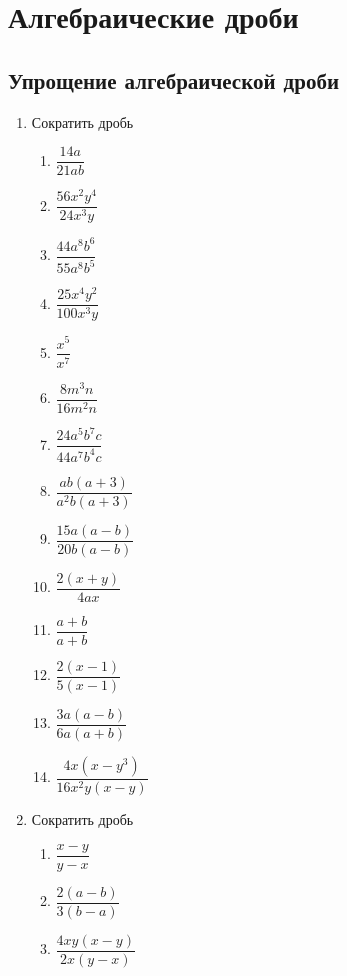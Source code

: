\documentclass[10pt, a4paper]{article}
\begin{document}
		
\section{Алгебраические дроби}
\subsection{Упрощение алгебраической дроби}
\begin{enumerate}
	\item \leveli Сократить дробь
	\begin{multicols}{3}
		\begin{enumerate}
			\item $\dfrac{14a}{21ab}$ 
			\item $\dfrac{56x^2y^4}{24x^3y}$ 
			\item $\dfrac{44a^8b^6}{55a^8b^5}$ 
			\item $\dfrac{25x^4y^2}{100x^3y}$ 
			\item $\dfrac{x^5}{x^7}$ 
			\item $\dfrac{8m^3n}{16m^2n}$ 
			\item $\dfrac{24a^5b^7c}{44a^7b^4c}$ 
			\item $\dfrac{ab(a+3)}{a^2b(a+3)}$ 
			\item $\dfrac{15a(a-b)}{20b(a-b)}$ 
			\item $\dfrac{2(x+y)}{4ax}$ 
			\item $\dfrac{a+b}{a+b}$ 
			\item $\dfrac{2(x-1)}{5(x-1)}$ 
			\item $\dfrac{3a(a-b)}{6a(a+b)}$ 
			\item $\dfrac{4x(x-y^3)}{16x^2y(x-y)}$ 
		\end{enumerate}
	\end{multicols}
	\item Сократить дробь
	\begin{multicols}{3}
		\begin{enumerate}
			\item $\dfrac{x-y}{y-x}$ 
			\item $\dfrac{2(a-b)}{3(b-a)}$ 
			\item $\dfrac{4xy(x-y)}{2x(y-x)}$ 

\end{enumerate}
\end{multicols}
\end{enumerate}
\end{document}
